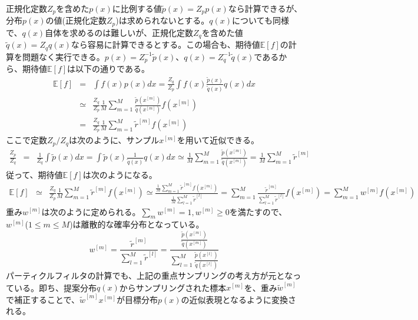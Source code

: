\documentclass[dvipdfmx,a4paper]{jsarticle}
\begin{document}
正規化定数$Z_p$を含めた$p(x)$に比例する値$\widetilde{p}(x) = Z_p p(x)$なら計算できるが、分布$p(x)$の値(正規化定数$Z_p$)は求められないとする。$q(x)$についても同様で、$q(x)$自体を求めるのは難しいが、正規化定数$Z_q$を含めた値$\widetilde{q}(x) = Z_q q(x)$なら容易に計算できるとする。この場合も、期待値$\mathbb{E}[f]$の計算を問題なく実行できる。$p(x) = Z_p^{-1} \widetilde{p}(x)$、$q(x) = Z_q^{-1} \widetilde{q}(x)$であるから、期待値$\mathbb{E}[f]$は以下の通りである。
\begin{eqnarray}
	\mathbb{E}[f] &=& \int f(x) p(x) dx = \frac{Z_q}{Z_p} \int f(x) \frac{\widetilde{p}(x)}{\widetilde{q}(x)} q(x) dx \nonumber \\
	&\simeq& \frac{Z_q}{Z_p} \frac{1}{M} \sum_{m = 1}^M \frac{\widetilde{p}(x^{[m]})}{\widetilde{q}(x^{[m]})} f(x^{[m]}) \\
	&=& \frac{Z_q}{Z_p} \frac{1}{M} \sum_{m = 1}^M \widetilde{r}^{[m]} f(x^{[m]})
\end{eqnarray}
ここで定数$Z_p/Z_q$は次のように、サンプル$x^{[m]}$を用いて近似できる。
\begin{eqnarray}
	\frac{Z_p}{Z_q} &=& \frac{1}{Z_q} \int \widetilde{p}(x) dx = \int \widetilde{p}(x) \frac{1}{\widetilde{q}(x)} q(x) dx \simeq \frac{1}{M} \sum_{m = 1}^M \frac{\widetilde{p}(x^{[m]})}{\widetilde{q}(x^{[m]})} = \frac{1}{M} \sum_{m = 1}^M \widetilde{r}^{[m]}
\end{eqnarray}
従って、期待値$\mathbb{E}[f]$は次のようになる。
\begin{eqnarray}
	\mathbb{E}[f] &\simeq& \frac{Z_q}{Z_p} \frac{1}{M} \sum_{m = 1}^M \widetilde{r}^{[m]} f(x^{[m]}) \simeq \frac{\displaystyle \frac{1}{M} \sum_{m = 1}^M \widetilde{r}^{[m]} f(x^{[m]})}{\displaystyle \frac{1}{M} \sum_{l = 1}^M \widetilde{r}^{[l]}} = \sum_{m = 1}^M \frac{\displaystyle \widetilde{r}^{[m]}}{\displaystyle \sum_{l = 1}^M \widetilde{r}^{[l]}} f(x^{[m]}) = \sum_{m = 1}^M w^{[m]} f(x^{[m]})
\end{eqnarray}
重み$w^{[m]}$は次のように定められる。$\sum_m w^{[m]} = 1, w^{[m]} \ge 0$を満たすので、$w^{[m]}$($1 \le m \le M$)は離散的な確率分布となっている。
\begin{equation}
	w^{[m]} = \frac{\displaystyle \widetilde{r}^{[m]}}{\displaystyle \sum_{l = 1}^M \widetilde{r}^{[l]}} = \frac{\displaystyle \frac{\widetilde{p}(x^{[m]})}{\widetilde{q}(x^{[m]})}}{\displaystyle \sum_{l = 1}^M \frac{\widetilde{p}(x^{[l]})}{\widetilde{q}(x^{[l]})}}
\end{equation}
パーティクルフィルタの計算でも、上記の重点サンプリングの考え方が元となっている。即ち、提案分布$q(x)$からサンプリングされた標本$x^{[m]}$を、重み$\widetilde{w}^{[m]}$で補正することで、$\widetilde{w}^{[m]} x^{[m]}$が目標分布$p(x)$の近似表現となるように変換される。\newline
\end{document}
